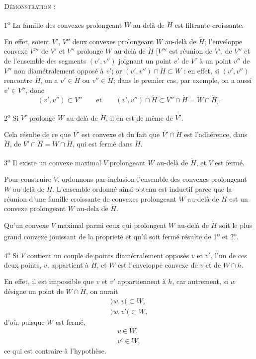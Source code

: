\documentclass[11pt]{article}
\newenvironment{proof}[1][]{\par}{\par}
\begin{document}
\begin{proof}
\textsc{Démonstration} :

1\textsuperscript{o} La famille des convexes prolongeant $W$ au-delà de $\mathring{H}$ est
filtrante croissante.

En effet, soient $V'$, $V''$ deux convexes prolongeant $W$ au-delà de $\mathring{H}$;
l'enveloppe convexe $V'''$ de $V'$ et $V''$ prolonge $W$ au-delà de $\mathring{H}$ [$V'''$ est
réunion de $V'$, de $V''$ et de l'ensemble des segments $(v', v'')$ joignant un point $v'$ de $V'$
à un point $v''$ de $V''$ non diamétralement opposé à $v'$; or
$(v', v'')\cap\mathring{H}\subset W$ : en effet, si $(v', v'')$ rencontre $\mathring{H}$, on a
$v'\in\mathring{H}$ ou $v''\in\mathring{H}$; dans le premier cas, par exemple, on a aussi
$v'\in V''$, donc
\[ (v', v'')\subset V''\qquad\text{et}\qquad(v', v'')\cap\mathring{H}\subset
V''\cap\mathring{H}=W\cap\mathring{H}]. \]

2\textsuperscript{o} Si $V'$ prolonge $W$ au-delà de $\mathring{H}$, il en est de même de
$\overline{V'}$.

Cela résulte de ce que $\overline{V'}$ est convexe et du fait que
$\overline{V'}\cap\mathring{H}$ est l'adhérence, dans $\mathring{H}$, de
$V'\cap\mathring{H}=W\cap\mathring{H}$, qui est fermé dans $\mathring{H}$.

3\textsuperscript{o} Il existe un convexe maximal $V$ prolongeant $W$ au-delà de $\mathring{H}$,
et $V$ est fermé.

Pour construire $V$, ordonnons par inclusion l'ensemble des convexes prolongeant $W$ au-delà de
$\mathring{H}$. L'ensemble ordonné ainsi obtenu est inductif parce que la réunion d'une famille
croissante de convexes prolongeant $W$ au-delà de $\mathring{H}$ est un convexe prolongeant $W$
au-dela de $\mathring{H}$.

Qu'un convexe $V$ maximal parmi ceux qui prolongent $W$ au-delà de $\mathring{H}$ soit le plus
grand convexe jouissant de la proprieté et qu'il soit fermé résulte de 1\textsuperscript{o} et
2\textsuperscript{o}.

4\textsuperscript{o} Si $V$ contient un couple de points diamétralement opposés $v$ et $v'$, l'un
de ces deux points, $v$, appartient à $\mathring{H}$, et $W$ est l'enveloppe convexe de $v$ et de
$W\cap h$.

En effet, il est impossible que $v$ et $v'$ appartiennent à $h$, car autrement, si $w$ désigne un
point de $W\cap\mathring{H}$, on aurait
\[ \begin{gathered} )w, v(\subset W,\\ )w, v'(\subset W, \end{gathered} \]
d'où, puisque $W$ est fermé,
\[ \begin{gathered} v\in W,\\ v'\in W, \end{gathered} \]
ce qui est contraire à l'hypothèse.


\end{proof}
\end{document}

